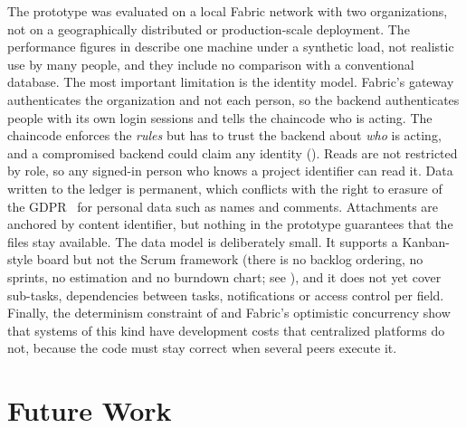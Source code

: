 The prototype was evaluated on a local Fabric network with two organizations, not on a geographically distributed or production-scale deployment. The performance figures in  describe one machine under a synthetic load, not realistic use by many people, and they include no comparison with a conventional database. The most important limitation is the identity model. Fabric's gateway authenticates the organization and not each person, so the backend authenticates people with its own login sessions and tells the chaincode who is acting. The chaincode enforces the \emph{rules} but has to trust the backend about \emph{who} is acting, and a compromised backend could claim any identity (). Reads are not restricted by role, so any signed-in person who knows a project identifier can read it. Data written to the ledger is permanent, which conflicts with the right to erasure of the GDPR~\cite{gdpr} for personal data such as names and comments. Attachments are anchored by content identifier, but nothing in the prototype guarantees that the files stay available. The data model is deliberately small. It supports a Kanban-style board but not the Scrum framework (there is no backlog ordering, no sprints, no estimation and no burndown chart; see ), and it does not yet cover sub-tasks, dependencies between tasks, notifications or access control per field. Finally, the determinism constraint of  and Fabric's optimistic concurrency show that systems of this kind have development costs that centralized platforms do not, because the code must stay correct when several peers execute it.

\section{Future Work}
\label{sec:future-work}

